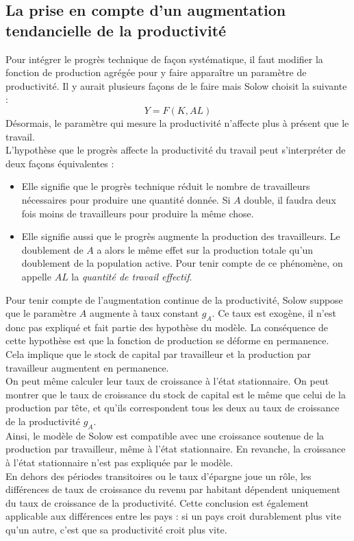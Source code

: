 \documentclass[10pt]{book}
\begin{document}
\subsection{La prise en compte d'un augmentation tendancielle de la productivité}
Pour intégrer le progrès technique de façon systématique, il faut modifier la fonction de production agrégée pour y faire apparaître un paramètre de productivité. Il y aurait plusieurs façons de le faire mais Solow choisit la suivante :
$$Y = F(K,AL)$$
Désormais, le paramètre qui mesure la productivité n'affecte plus à présent que le travail. \\
L'hypothèse que le progrès affecte la productivité du travail peut s'interpréter de deux façons équivalentes : 
\begin{itemize}
  \item Elle signifie que le progrès technique réduit le nombre de travailleurs nécessaires pour produire une quantité donnée. Si $A$ double, il faudra deux fois moins de travailleurs pour produire la même chose.
  \item Elle signifie aussi que le progrès augmente la production des travailleurs. Le doublement de $A$ a alors le même effet sur la production totale qu'un doublement de la population active. Pour tenir compte de ce phénomène, on appelle $AL$ la \textit{quantité de travail effectif}.
\end{itemize}
Pour tenir compte de l'augmentation continue de la productivité, Solow suppose que le paramètre $A$ augmente à taux constant $g_A$. Ce taux est exogène, il n'est donc pas expliqué et fait partie des hypothèse du modèle. La conséquence de cette hypothèse est que la fonction de production se déforme en permanence. Cela implique que le stock de capital par travailleur et la production par travailleur augmentent en permanence. \\
On peut même calculer leur taux de croissance à l'état stationnaire. On peut montrer que le taux de croissance du stock de capital est le même que celui de la production par tête, et qu'ils correspondent tous les deux au taux de croissance de la productivité $g_A$. \\
Ainsi, le modèle de Solow est compatible avec une croissance soutenue de la production par travailleur, même à l'état stationnaire. En revanche, la croissance à l'état stationnaire n'est pas expliquée par le modèle. \\
En dehors des périodes transitoires ou le taux d'épargne joue un rôle, les différences de taux de croissance du revenu par habitant dépendent uniquement du taux de croissance de la productivité. Cette conclusion est également applicable aux différences entre les pays : si un pays croit durablement plus vite qu'un autre, c'est que sa productivité croit plus vite.
\end{document}
